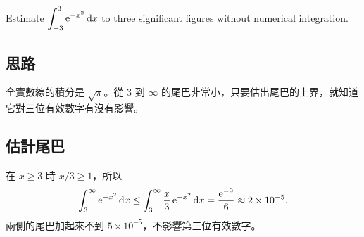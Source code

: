 \documentclass[10pt,a4paper]{article}
\begin{document}

\begin{statement}
Estimate $\displaystyle\int_{-3}^{3}\mathrm{e}^{-x^2}\mathop{}\!\mathrm{d} x$ to three significant figures without numerical integration.
\end{statement}

\subsection*{思路}
全實數線的積分是 $\sqrt\pi$。從 $3$ 到 $\infty$ 的尾巴非常小，只要估出尾巴的上界，就知道它對三位有效數字有沒有影響。

\subsection*{估計尾巴}
在 $x\ge 3$ 時 $x/3\ge1$，所以
\[
  \int_3^\infty\mathrm{e}^{-x^2}\mathop{}\!\mathrm{d} x\le\int_3^\infty\frac{x}{3}\,\mathrm{e}^{-x^2}\mathop{}\!\mathrm{d} x=\frac{\mathrm{e}^{-9}}{6}\approx 2\times10^{-5}.
\]
兩側的尾巴加起來不到 $5\times10^{-5}$，不影響第三位有效數字。
\end{document}
